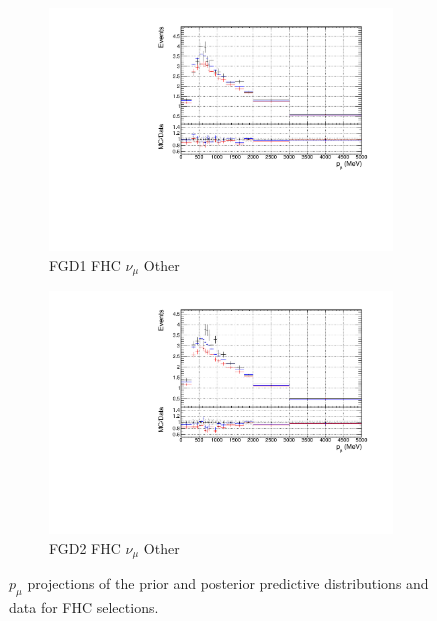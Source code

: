 \begin{figure}[!h]
\begin{subfigure}{0.49\textwidth}
  \centering
  \includegraphics[width=\textwidth]{figs/priorpred1D_p_FGD1_numuCC_other}
  \caption{FGD1 FHC $\nu_{\mu}$ Other}
\end{subfigure}
\begin{subfigure}{0.49\textwidth}
  \centering
  \includegraphics[width=\textwidth]{figs/priorpred1D_p_FGD2_numuCC_other}
  \caption{FGD2 FHC $\nu_{\mu}$ Other}
\end{subfigure}
\caption{$p_{\mu}$ projections of the prior and posterior predictive distributions and data for FHC \numu selections.}
\label{fig:priorpost_fhc_p}
\end{figure}


